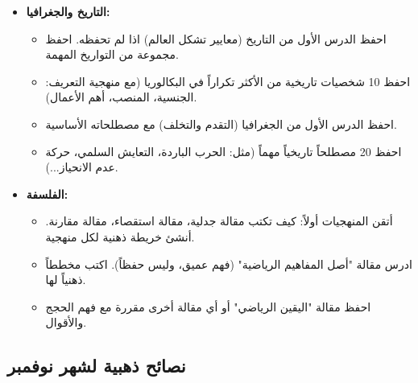 \documentclass[12pt,a4paper]{book}
\begin{document}
\begin{itemize}
		\item \textbf{التاريخ والجغرافيا:}
		\begin{itemize}
			\item احفظ الدرس الأول من التاريخ (معايير تشكل العالم) اذا لم تحفظه. احفظ مجموعة من التواريخ المهمة.
			\item احفظ 10 شخصيات تاريخية من الأكثر تكراراً في البكالوريا (مع منهجية التعريف: الجنسية، المنصب، أهم الأعمال).
			\item احفظ الدرس الأول من الجغرافيا (التقدم والتخلف) مع مصطلحاته الأساسية.
			\item احفظ 20 مصطلحاً تاريخياً مهماً (مثل: الحرب الباردة، التعايش السلمي، حركة عدم الانحياز...).
		\end{itemize}
		
		\item \textbf{الفلسفة:}
		\begin{itemize}
			\item أتقن المنهجيات أولاً: كيف تكتب مقالة جدلية، مقالة استقصاء، مقالة مقارنة. أنشئ خريطة ذهنية لكل منهجية.
			\item ادرس مقالة "أصل المفاهيم الرياضية" (فهم عميق، وليس حفظاً). اكتب مخططاً ذهنياً لها.
			\item احفظ مقالة "اليقين الرياضي" أو أي مقالة أخرى مقررة مع فهم الحجج والأقوال.
		\end{itemize}
	\end{itemize}
	
	\subsection{نصائح ذهبية لشهر نوفمبر}
	\label{sec:random-tips3}
	
\end{document}
